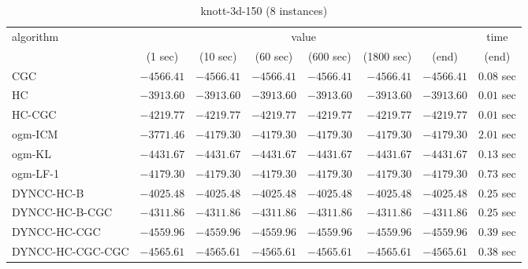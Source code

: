 \begin{table}[H]
\tiny
\centering
\caption{knott-3d-150 (8 instances)}
\label{tab:anytimetable-knott-3d-150}
\begin{tabular}{lrrrrrrr}
\toprule
           algorithm &                                   \multicolumn{6}{c}{value} & \multicolumn{1}{c}{time}   \\  
\cmidrule(lr){2-7}\cmidrule(lr){8-8}  
                     & \multicolumn{1}{c}{(1 sec)} & \multicolumn{1}{c}{(10 sec)} & \multicolumn{1}{c}{(60 sec)} & \multicolumn{1}{c}{(600 sec)} & \multicolumn{1}{c}{(1800 sec)} & \multicolumn{1}{c}{(end)} & \multicolumn{1}{c}{(end)}   \\ \midrule 
                 CGC & $     -4566.41$ & $     -4566.41$ & $     -4566.41$ & $     -4566.41$ & $     -4566.41$ & $     -4566.41$ & $         0.08$ sec   \\ 
                  HC & $     -3913.60$ & $     -3913.60$ & $     -3913.60$ & $     -3913.60$ & $     -3913.60$ & $     -3913.60$ & $         0.01$ sec   \\ 
              HC-CGC & $     -4219.77$ & $     -4219.77$ & $     -4219.77$ & $     -4219.77$ & $     -4219.77$ & $     -4219.77$ & $         0.01$ sec   \\ 
             ogm-ICM & $     -3771.46$ & $     -4179.30$ & $     -4179.30$ & $     -4179.30$ & $     -4179.30$ & $     -4179.30$ & $         2.01$ sec   \\ 
              ogm-KL & $     -4431.67$ & $     -4431.67$ & $     -4431.67$ & $     -4431.67$ & $     -4431.67$ & $     -4431.67$ & $         0.13$ sec   \\ 
            ogm-LF-1 & $     -4179.30$ & $     -4179.30$ & $     -4179.30$ & $     -4179.30$ & $     -4179.30$ & $     -4179.30$ & $         0.73$ sec   \\ 
          DYNCC-HC-B & $     -4025.48$ & $     -4025.48$ & $     -4025.48$ & $     -4025.48$ & $     -4025.48$ & $     -4025.48$ & $         0.25$ sec   \\ 
      DYNCC-HC-B-CGC & $     -4311.86$ & $     -4311.86$ & $     -4311.86$ & $     -4311.86$ & $     -4311.86$ & $     -4311.86$ & $         0.25$ sec   \\ 
        DYNCC-HC-CGC & $     -4559.96$ & $     -4559.96$ & $     -4559.96$ & $     -4559.96$ & $     -4559.96$ & $     -4559.96$ & $         0.39$ sec   \\ 
    DYNCC-HC-CGC-CGC & $     -4565.61$ & $     -4565.61$ & $     -4565.61$ & $     -4565.61$ & $     -4565.61$ & $     -4565.61$ & $         0.38$ sec   \\ 

\end{tabular}
\end{table}
